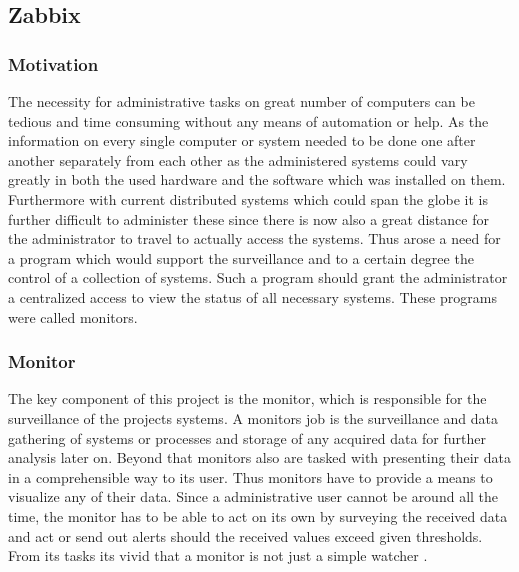 \subsection{Zabbix}

\subsubsection{Motivation}
	The necessity for administrative tasks on great number of computers can be tedious and time consuming without any means of automation or help. As the information on every single computer or system needed to be done one after another separately from each other as the administered systems could vary greatly in both the used hardware and the software which was installed on them. Furthermore with current distributed systems which could span the globe it is further difficult to administer these since there is now also a great distance for the administrator to travel to actually access the systems. Thus arose a need for a program which would support the surveillance and to a certain degree the control of a collection of systems. Such a program should grant the administrator a centralized access to view the status of all necessary systems. These programs were called monitors.
\subsubsection{Monitor}
	The key component of this project is the monitor, which is responsible for the surveillance of the projects systems. A monitors job is the surveillance and data gathering of systems or processes and storage of any acquired data for further analysis later on. Beyond that monitors also are tasked with presenting their data in a comprehensible way to its user. Thus monitors have to provide a means to visualize any of their data. Since a administrative user cannot be around all the time, the monitor has to be able to act on its own by surveying the received data and act or send out alerts should the received values exceed given thresholds. From its tasks its vivid that a monitor is not just a simple watcher \cite{zab1}.
